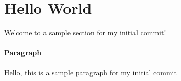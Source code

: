 \documentclass[12pt]{article}
\begin{document}
\maketitle



\section{Hello World}
Welcome to a sample section for my initial commit!

\paragraph{Paragraph}
Hello, this is a sample paragraph for my initial commit
\end{document}
